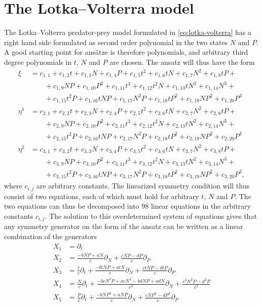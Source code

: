 \section{The Lotka--Volterra model}

The Lotka--Volterra predator-prey model formulated in \cref{eq:lotka-volterra} has a right hand side formulated as second order polynomial in the two states \(N\) and \(P\).
A good starting point for ansätze is therefore polynomials, and arbitrary third degree polynomials in \(t\), \(N\) and \(P\) are chosen.
The ansatz will thus have the form
\begin{align}
  \xi &= c_{1,1} + c_{1,2}t + c_{1,3}N + c_{1,4}P + c_{1,5}t^{2} + c_{1,6}tN + c_{1,7}N^{2} + c_{1,8}tP + \\ & \qquad + c_{1,9}NP + c_{1,10}P^{2} + c_{1,11}t^{3} + c_{1,12}t^{2}N + c_{1,13}tN^{2} + c_{1,14}N^{3} + \\ & \qquad + c_{1,15}t^{2}P + c_{1,16}tNP + c_{1,17}N^{2}P + c_{1,18}tP^{2} + c_{1,19}NP^{2} + c_{1,20}P^{3} \\
  \eta^{1} &= c_{2,1} + c_{2,2}t + c_{2,3}N + c_{2,4}P + c_{2,5}t^{2} + c_{2,6}tN + c_{2,7}N^{2} + c_{2,8}tP + \\ & \qquad + c_{2,9}NP + c_{2,10}P^{2} + c_{2,11}t^{3} + c_{2,12}t^{2}N + c_{2,13}tN^{2} + c_{2,14}N^{3} + \\ & \qquad + c_{2,15}t^{2}P + c_{2,16}tNP + c_{2,17}N^{2}P + c_{2,18}tP^{2} + c_{2,19}NP^{2} + c_{2,20}P^{3} \\
  \eta^{2} &= c_{3,1} + c_{3,2}t + c_{3,3}N + c_{3,4}P + c_{3,5}t^{2} + c_{3,6}tN + c_{3,7}N^{2} + c_{3,8}tP + \\ & \qquad + c_{3,9}NP + c_{3,10}P^{2} + c_{3,11}t^{3} + c_{3,12}t^{2}N + c_{3,13}tN^{2} + c_{3,14}N^{3} + \\ & \qquad + c_{3,15}t^{2}P + c_{3,16}tNP + c_{3,17}N^{2}P + c_{3,18}tP^{2} + c_{3,19}NP^{2} + c_{3,20}P^{3},
\end{align}
where \(c_{i,j}\) are arbitrary constants.
The linearized symmetry condition will thus consist of two equations, each of which must hold for arbitrary \(t\), \(N\) and \(P\).
The two equations can thus be decomposed into 98 linear equations in the arbitrary constants \(c_{i,j}\).
The solution to this overdetermined system of equations gives that any symmetry generator on the form of the ansatz can be written as a linear combination of the generators
\begin{align}
  X_1 &= \partial_t \\
  X_2 &= \frac{-bNP + aN}{c} \partial_N + \frac{cNP - dP}{c} \partial_P \\
  X_3 &= \frac{t}{c} \partial_t + \frac{-btNP + atN}{c} \partial_N + \frac{ctNP - dtP}{c} \partial_P \\
  X_4 &= \frac{N}{c} \partial_t + \frac{-bcN^2P + acN^2 - bdNP + adN}{c^2} \partial_N + \frac{c^2N^2P - d^2P}{c^2} \\
  X_5 &= \frac{P}{c} \partial_t + \frac{-bNP^2 + aNP}{c} \partial_N + \frac{cNP^2 - dP^2}{c} \partial_P
\end{align}

